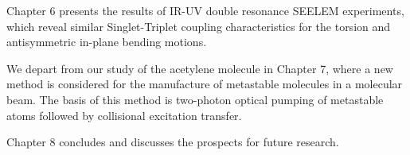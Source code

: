 \documentclass[12pt]{mitthesis}
\begin{document}
Chapter 6 presents the results of IR-UV double resonance
SEELEM experiments, which reveal similar Singlet-Triplet coupling
characteristics for the torsion and antisymmetric in-plane bending
motions.

We depart from our study of the acetylene molecule in Chapter 7, where
a new method is considered for the manufacture of metastable molecules
in a molecular beam.  The basis of this method is two-photon optical
pumping of metastable atoms followed by collisional excitation
transfer.  

Chapter 8 concludes and discusses the prospects for future
research.



\end{document}
